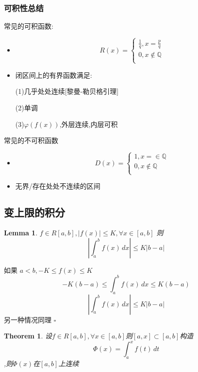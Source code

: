 \documentclass[11pt,hyperref,a4paper,UTF8]{ctexart}
\newtheorem{theorem}{Theorem}[subsection]
\newtheorem{lemma}{Lemma}[subsection]
\newenvironment{cproof}{%
\heiti{证明}\kaishu
}{%
  \hfill $\square$
  \par\bigskip
}
\newcommand{\QQ}{\mathbb{Q}}
\newcommand{\abs}[1]{\left|#1\right|}
\begin{document}
\begin{CJK}{UTF8}{gkai}
\subsubsection{可积性总结}
常见的可积函数:

\begin{itemize}
  \item \[R(x) = \begin{cases}
    \frac{1}{q}, x = \frac{p}{q}\\
    0,x \notin \QQ\\
  \end{cases}\]
  \item 闭区间上的有界函数满足:

  (1)几乎处处连续[黎曼-勒贝格引理]

  (2)单调

  (3)$\varphi(f(x))$,外层连续,内层可积
\end{itemize}

常见的不可积函数

\begin{itemize}
  \item \[D(x) = \begin{cases}
    1, x = \in \QQ\\
    0,x \notin \QQ\\
  \end{cases}\]
  \item 无界/存在处处不连续的区间
\end{itemize}


\subsection{变上限的积分}

\begin{lemma}
  $f\in R[a,b] ,|f(x)| \leq K ,\forall x\in [a,b]$
  则\[\abs{\int_{a}^{b}f(x)\,dx} \leq K|b - a|\]
\end{lemma}

\begin{cproof}
如果 $a < b, -K \leq f(x) \leq K$\\
\[-K(b - a) \leq \int_{a}^{b}f(x) \, dx \leq K(b - a)\]
\[\abs{\int_{a}^{b}f(x)\,dx} \leq K|b - a|\]
另一种情况同理
\end{cproof}
\begin{theorem}

设$f\in R[a,b],\forall x\in [a,b]$则$ [a,x] \subset[a,b]$构造
\[\varPhi(x) = \int_{a}^{x}f(t)\,dt\],则$\varPhi(x)$在$[a,b]$上连续\\
  

\end{theorem}
\end{CJK}
\end{document}
